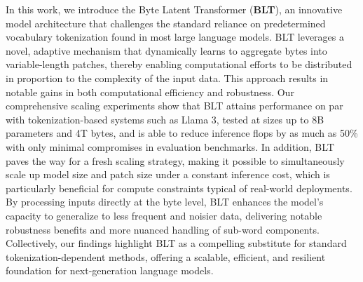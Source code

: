 In this work, we introduce the Byte Latent Transformer (\textbf{BLT}), an innovative model architecture that challenges the standard reliance on predetermined vocabulary tokenization found in most large language models. {\textsc BLT} leverages a novel, adaptive mechanism that dynamically learns to aggregate bytes into variable-length patches, thereby enabling computational efforts to be distributed in proportion to the complexity of the input data. This approach results in notable gains in both computational efficiency and robustness. Our comprehensive scaling experiments show that {\textsc BLT} attains performance on par with tokenization-based systems such as Llama 3, tested at sizes up to 8B parameters and 4T bytes, and is able to reduce inference flops by as much as 50\% with only minimal compromises in evaluation benchmarks. In addition, {\textsc BLT} paves the way for a fresh scaling strategy, making it possible to simultaneously scale up model size and patch size under a constant inference cost, which is particularly beneficial for compute constraints typical of real-world deployments. By processing inputs directly at the byte level, {\textsc BLT} enhances the model's capacity to generalize to less frequent and noisier data, delivering notable robustness benefits and more nuanced handling of sub-word components. Collectively, our findings highlight {\textsc BLT} as a compelling substitute for standard tokenization-dependent methods, offering a scalable, efficient, and resilient foundation for next-generation language models.

